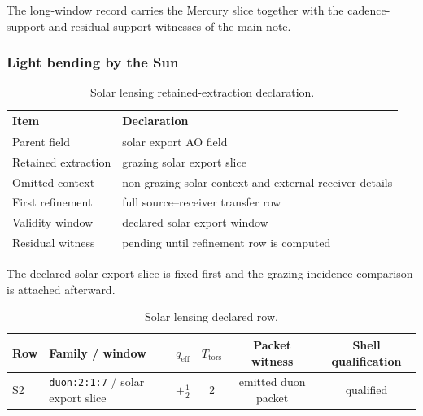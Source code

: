 The long-window record carries the Mercury slice together with the cadence-support and residual-support witnesses of the main note.

\subsubsection{Light bending by the Sun}
\label{man:solar-lensing-witness}

\begin{table}[H]
\centering
\caption{Solar lensing retained-extraction declaration.}
\label{tab:lensing-retention}
\begin{threeparttable}
\begin{tabularx}{\linewidth}{@{}lX@{}}
\toprule
Item & Declaration \\
\midrule
Parent field & solar export AO field \\
Retained extraction & grazing solar export slice \\
Omitted context & non-grazing solar context and external receiver details \\
First refinement & full source--receiver transfer row \\
Validity window & declared solar export window \\
Residual witness & pending until refinement row is computed \\
\bottomrule
\end{tabularx}
\end{threeparttable}
\end{table}

The declared solar export slice is fixed first and the grazing-incidence comparison is attached afterward.

\begin{table}[H]
\centering
\caption{Solar lensing declared row.}
\label{tab:solar-lensing-row}
\begin{threeparttable}
\small
\begin{tabularx}{\linewidth}{@{}lXcccc@{}}
\toprule
Row & Family / window & $q_{\mathrm{eff}}$ & $T_{\mathrm{tors}}$ & Packet witness & Shell qualification \\
\midrule
S2 & \texttt{duon:2:1:7} / solar export slice & $+\frac{1}{2}$ & 2 & emitted duon packet & qualified \\
\bottomrule
\end{tabularx}
\end{threeparttable}
\end{table}


